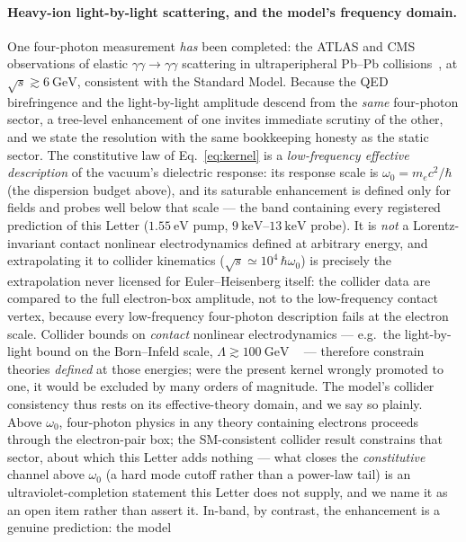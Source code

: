 \documentclass[aps,prd,twocolumn,superscriptaddress,nofootinbib,longbibliography]{revtex4-2}
\begin{document}
\paragraph*{Heavy-ion light-by-light scattering, and the model's frequency domain.}
One four-photon measurement \emph{has} been completed: the ATLAS and CMS
observations of elastic $\gamma\gamma\to\gamma\gamma$ scattering in ultraperipheral
Pb--Pb collisions~\cite{ATLAS2019LbL,CMS2019LbL}, at
$\sqrt{s}\gtrsim\SI{6}{\giga\electronvolt}$, consistent with the Standard Model.
Because the QED birefringence and the light-by-light amplitude descend from the
\emph{same} four-photon sector, a tree-level enhancement of one invites immediate
scrutiny of the other, and we state the resolution with the same bookkeeping honesty
as the static sector. The constitutive law of Eq.~\eqref{eq:kernel} is a
\emph{low-frequency effective description} of the vacuum's dielectric response: its
response scale is $\omega_0=m_ec^2/\hbar$ (the dispersion budget above), and its
saturable enhancement is defined only for fields and probes well below that scale
--- the band containing every registered prediction of this Letter
($\SI{1.55}{\electronvolt}$ pump, $\SIrange{9}{13}{\kilo\electronvolt}$ probe). It
is \emph{not} a Lorentz-invariant contact nonlinear electrodynamics defined at
arbitrary energy, and extrapolating it to collider kinematics
($\sqrt{s}\simeq10^4\,\hbar\omega_0$) is precisely the extrapolation never licensed
for Euler--Heisenberg itself: the collider data are compared to the full
electron-box amplitude, not to the low-frequency contact vertex, because every
low-frequency four-photon description fails at the electron scale. Collider bounds
on \emph{contact} nonlinear electrodynamics --- e.g.\ the light-by-light bound on
the Born--Infeld scale, $\Lambda\gtrsim\SI{100}{\giga\electronvolt}$%
~\cite{EllisMavromatosYou2017} --- therefore constrain theories \emph{defined} at
those energies; were the present kernel wrongly promoted to one, it would be
excluded by many orders of magnitude. The model's collider consistency thus rests
on its effective-theory domain, and we say so plainly. Above $\omega_0$, four-photon
physics in any theory containing electrons proceeds through the electron-pair box;
the SM-consistent collider result constrains that sector, about which this Letter
adds nothing --- what closes the \emph{constitutive} channel above $\omega_0$
(a hard mode cutoff rather than a power-law tail) is an ultraviolet-completion
statement this Letter does not supply, and we name it as an open item rather than
assert it. In-band, by contrast, the enhancement is a genuine prediction: the model
\end{document}
